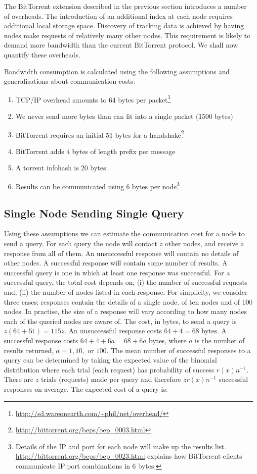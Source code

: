 The BitTorrent extension described in the previous section introduces a number of overheads. The introduction of an additional index at each node requires additional local storage space. Discovery of tracking data is achieved by having nodes make requests of relatively many other nodes. This requirement is likely to demand more bandwidth than the current BitTorrent protocol. We shall now quantify these overheads.

Bandwidth consumption is calculated using the following assumptions and generalisations about communication costs: 
\begin{enumerate}
    \item TCP/IP overhead amounts to 64 bytes per packet\footnote{\url{http://sd.wareonearth.com/~phil/net/overhead/}}
    \item We never send more bytes than can fit into a single packet (1500 bytes)
    \item BitTorrent requires an initial 51 bytes for a handshake\footnote{\url{http://bittorrent.org/beps/bep_0003.html}}
    \item BitTorrent adds 4 bytes of length prefix per message\footnotemark[\value{footnote}]
    \item A torrent infohash is 20 bytes\footnotemark[\value{footnote}]
    \item Results can be communicated using 6 bytes per node\footnote{Details of the IP and port for each node will make up the results list. \url{http://bittorrent.org/beps/bep_0023.html} explains how BitTorrent clients communicate IP:port combinations in 6 bytes.}
\end{enumerate}

\subsection{Single Node Sending Single Query}

    Using these assumptions we can estimate the communication cost for a node to send a query. For each query the node will contact $z$ other nodes, and receive a response from all of them. An unsuccessful response will contain no details of other nodes. A successful response will contain some number of results. A successful query is one in which at least one response was successful. For a successful query, the total cost depends on, (i) the number of successful requests and, (ii) the number of nodes listed in each response. For simplicity, we consider three cases; responses contain the details of a single node, of ten nodes and of 100 nodes. In practise, the size of a response will vary according to how many nodes each of the queried nodes are aware of. The cost, in bytes, to send a query is $z(64+51)=115z$. An unsuccessful response costs $64+4=68$ bytes. A successful response costs $64+4+6a=68+6a$ bytes, where $a$ is the number of results returned, $a=1,10,\textrm{ or }100$. The mean number of successful responses to a query can be determined by taking the expected value of the binomial distribution where each trial (each request) has probability of success $\displaystyle r(x)n^{-1}$. There are $z$ trials (requests) made per query and therefore $\displaystyle zr(x)n^{-1}$ successful responses on average. The expected cost of a query is:

